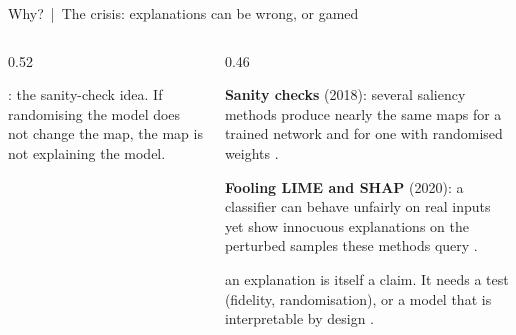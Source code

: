 \documentclass[aspectratio=169,10pt]{beamer}
\begin{document}
\begin{frame}{Why? \,|\, The crisis: explanations can be wrong, or gamed}
\begin{columns}[T]
\begin{column}{0.52\textwidth}
\begin{sfig}[0.62]
\end{sfig}
{\scriptsize\illus: the sanity-check idea. If randomising the model does not change the map, the map is not explaining the model.}
\end{column}
\begin{column}{0.46\textwidth}
{\footnotesize
\textbf{Sanity checks} (2018): several saliency methods produce nearly the same maps for a trained network and for one with randomised weights .

\vspace{2mm}
\textbf{Fooling LIME and SHAP} (2020): a classifier can behave unfairly on real inputs yet show innocuous explanations on the perturbed samples these methods query .

\vspace{2mm}
 an explanation is itself a claim. It needs a test (fidelity, randomisation), or a model that is interpretable by design .}
\end{column}
\end{columns}
\end{frame}
\end{document}
